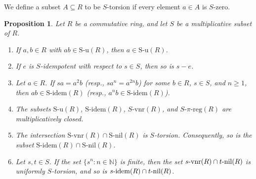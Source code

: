 \documentclass[12pt]{article}
\newtheorem{prop}[thm]{\bf Proposition}
\def\Sidem{\mathrm{S\text{-}idem}}
\def\Snil{\mathrm{S\text{-}nil}}
\def\Su{\mathrm{S\text{-}u}}
\def\Svnr{\mathrm{S\text{-}vnr}}
\def\idem{{\rm idem}}
\def\nil{{\rm nil}}
\def\vnr{{\rm vnr}}
\begin{document}
We define a subset \( A \subseteq R \) to be \( S \)-torsion if every element \( a \in A \) is \( S \)-zero.

\begin{prop}\label{prop-on-interse-of-some-special-subset} Let \( R \) be a commutative ring, and let $S$ be a multiplicative subset of $R$. 
\begin{enumerate}
\item If \( a, b \in R \) with \( ab \in \Su(R) \), then \( a \in \Su(R) \).

\item If \( e \) is \( S \)-idempotent with respect to \( s \in S \), then so is \( s - e \).
\item Let \( a \in R \). If \( sa = a^2b \) (resp., \( sa^n = a^{2n}b \)) for some \( b \in R \), \( s \in S \), and \( n \geq 1 \), then \( ab \in \Sidem(R) \) (resp., \( a^n b \in \Sidem(R) \)).
   
    \item The subsets \( \Su(R) \), \( \Sidem(R) \), \( S\text{-}\mathrm{vnr}(R) \), and \( S\text{-}\pi\text{-}\mathrm{reg}(R) \) are multiplicatively closed.
    
    \item The intersection \( \Svnr(R) \cap \Snil(R) \) is \( S \)-torsion. Consequently, so is the subset \( \Sidem(R) \cap \Snil(R) \).
     
    \item Let \( s, t \in S \). If the set \( \{s^n : n \in \mathbb{N} \} \) is finite, then the set \( s\text{-}\vnr(R) \cap t\text{-}\nil(R) \) is uniformly \( S \)-torsion, and so is \( s\text{-}\idem(R) \cap t\text{-}\nil(R) \).
\end{enumerate}
\end{prop}
\end{document}
